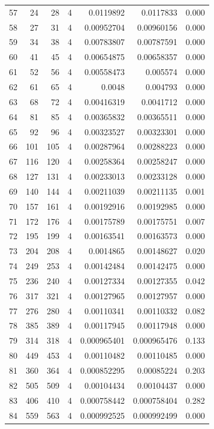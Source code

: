 \begin{tabular}{r r r r r r r}
57 & 24 & 28 & 4 & 0.0119892 & 0.0117833 & 0.000 \\
58 & 27 & 31 & 4 & 0.00952704 & 0.00960156 & 0.000 \\
59 & 34 & 38 & 4 & 0.00783807 & 0.00787591 & 0.000 \\
60 & 41 & 45 & 4 & 0.00654875 & 0.00658357 & 0.000 \\
61 & 52 & 56 & 4 & 0.00558473 & 0.005574 & 0.000 \\
62 & 61 & 65 & 4 & 0.0048 & 0.004793 & 0.000 \\
63 & 68 & 72 & 4 & 0.00416319 & 0.0041712 & 0.000 \\
64 & 81 & 85 & 4 & 0.00365832 & 0.00365511 & 0.000 \\
65 & 92 & 96 & 4 & 0.00323527 & 0.00323301 & 0.000 \\
66 & 101 & 105 & 4 & 0.00287964 & 0.00288223 & 0.000 \\
67 & 116 & 120 & 4 & 0.00258364 & 0.00258247 & 0.000 \\
68 & 127 & 131 & 4 & 0.00233013 & 0.00233128 & 0.000 \\
69 & 140 & 144 & 4 & 0.00211039 & 0.00211135 & 0.001 \\
70 & 157 & 161 & 4 & 0.00192916 & 0.00192985 & 0.000 \\
71 & 172 & 176 & 4 & 0.00175789 & 0.00175751 & 0.007 \\
72 & 195 & 199 & 4 & 0.00163541 & 0.00163573 & 0.000 \\
73 & 204 & 208 & 4 & 0.0014865 & 0.00148627 & 0.020 \\
74 & 249 & 253 & 4 & 0.00142484 & 0.00142475 & 0.000 \\
75 & 236 & 240 & 4 & 0.00127334 & 0.00127355 & 0.042 \\
76 & 317 & 321 & 4 & 0.00127965 & 0.00127957 & 0.000 \\
77 & 276 & 280 & 4 & 0.00110341 & 0.00110332 & 0.082 \\
78 & 385 & 389 & 4 & 0.00117945 & 0.00117948 & 0.000 \\
79 & 314 & 318 & 4 & 0.000965401 & 0.000965476 & 0.133 \\
80 & 449 & 453 & 4 & 0.00110482 & 0.00110485 & 0.000 \\
81 & 360 & 364 & 4 & 0.000852295 & 0.00085224 & 0.203 \\
82 & 505 & 509 & 4 & 0.00104434 & 0.00104437 & 0.000 \\
83 & 406 & 410 & 4 & 0.000758442 & 0.000758404 & 0.282 \\
84 & 559 & 563 & 4 & 0.000992525 & 0.000992499 & 0.000 \\

\end{tabular}
